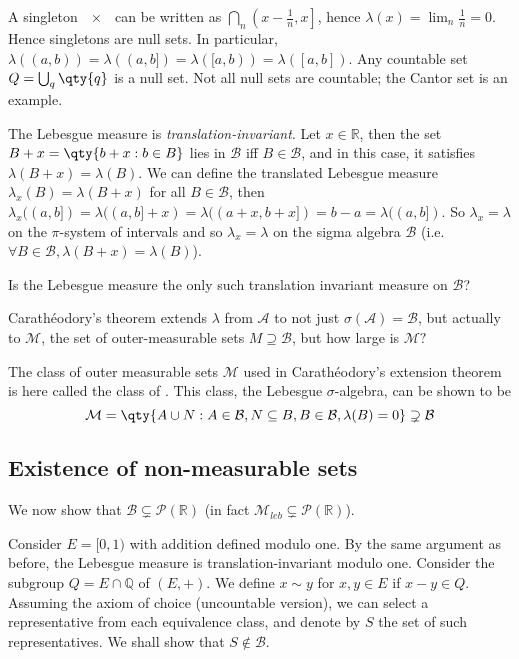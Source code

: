 \begin{remark}
	A singleton $\qty{x}$ can be written as $\bigcap_n \left(x-\frac 1n, x\right]$, hence $\lambda({x}) = \lim_n \frac 1n = 0$.
	Hence singletons are null sets.
	In particular, $\lambda((a,b)) = \lambda((a,b]) = \lambda([a,b)) = \lambda([a,b])$.
	Any countable set $Q = \bigcup_q \qty{q}$ is a null set.
	Not all null sets are countable; the Cantor set is an example.

	The Lebesgue measure is \emph{translation-invariant}.
	Let $x \in \mathbb R$, then the set $B + x = \qty{b + x : b \in B}$ lies in $\mathcal B$ iff $B \in \mathcal B$, and in this case, it satisfies $\lambda(B + x) = \lambda(B)$.
	We can define the translated Lebesgue measure $\lambda_x(B) = \lambda(B + x)$ for all $B \in \mathcal B$, then $\lambda_x((a,b]) = \lambda((a, b] + x) = \lambda((a + x, b+x]) = b - a = \lambda((a, b])$.
	So $\lambda_x = \lambda$ on the $\pi$-system of intervals and so $\lambda_x = \lambda$ on the sigma algebra $\mathcal{B}$ (i.e. $\forall B \in \mathcal{B}, \lambda(B+x) = \lambda(B)$).

	\begin{question}
		Is the Lebesgue measure the only such translation invariant measure on $\mathcal{B}$?
	\end{question}

	Carath\'eodory's theorem extends $\lambda$ from $\mathcal{A}$ to not just $\sigma(\mathcal{A}) = \mathcal{B}$, but actually to $\mathcal{M}$, the set of outer-measurable sets $M \supseteq \mathcal{B}$, but how large is $\mathcal{M}?$

	The class of outer measurable sets $\mathcal M$ used in Carath\'eodory's extension theorem is here called the class of .
	This class, the Lebesgue $\sigma$-algebra, can be shown to be
	\[ \mathcal M = \qty{A \cup N : A \in \mathcal B, N \subseteq B, B \in \mathcal B, \lambda(B) = 0 } \supsetneq \mathcal B \]
\end{remark}

\subsection{Existence of non-measurable sets}

We now show that $\mathcal{B} \subsetneq \mathcal{P}(\mathbb{R})$ (in fact $\mathcal{M}_{leb} \subsetneq \mathcal{P}(\mathbb{R})$).

Consider $E = [0,1)$ with addition defined modulo one.
By the same argument as before, the Lebesgue measure is translation-invariant modulo one.
Consider the subgroup $Q = E \cap \mathbb Q$ of $(E, +)$.
We define $x \sim y$ for $x, y \in E$ if $x - y \in Q$.
Assuming the axiom of choice (uncountable version), we can select a representative from each equivalence class, and denote by $S$ the set of such representatives.
We shall show that $S \notin \mathcal{B}$.

